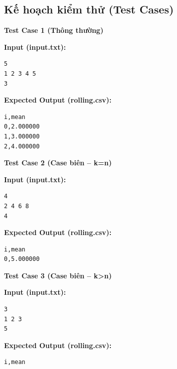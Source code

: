 \subsection{Kế hoạch kiểm thử (Test Cases)}

\textbf{Test Case 1 (Thông thường)}

\textbf{Input (input.txt):}
\begin{lstlisting}
5
1 2 3 4 5
3
\end{lstlisting}

\textbf{Expected Output (rolling.csv):}
\begin{lstlisting}
i,mean
0,2.000000
1,3.000000
2,4.000000
\end{lstlisting}

\vspace{0.5cm}

\textbf{Test Case 2 (Case biên -- k=n)}

\textbf{Input (input.txt):}
\begin{lstlisting}
4
2 4 6 8
4
\end{lstlisting}

\textbf{Expected Output (rolling.csv):}
\begin{lstlisting}
i,mean
0,5.000000
\end{lstlisting}

\vspace{0.5cm}

\textbf{Test Case 3 (Case biên -- k>n)}

\textbf{Input (input.txt):}
\begin{lstlisting}
3
1 2 3
5
\end{lstlisting}

\textbf{Expected Output (rolling.csv):}
\begin{lstlisting}
i,mean
\end{lstlisting}